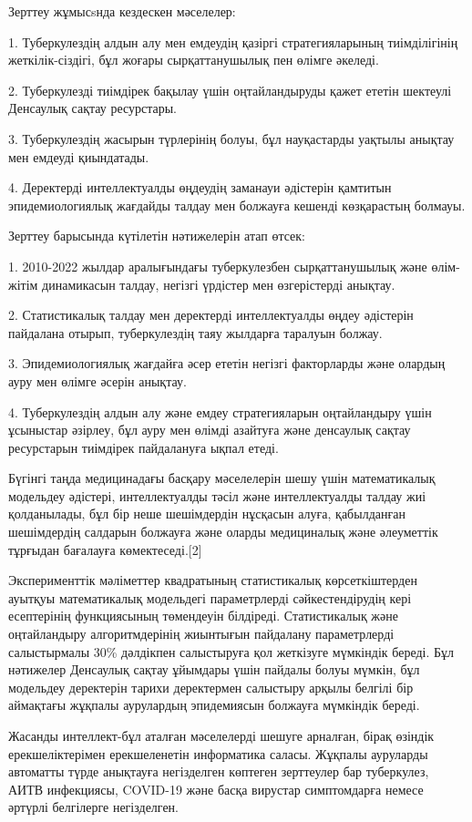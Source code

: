 \begin{multicols}{2}
Зерттеу жұмысsнда кездескен мәселелер:

1. Туберкулездің алдын алу мен емдеудің қазіргі стратегияларының
тиімділігінің жеткілік-сіздігі, бұл жоғары сырқаттанушылық пен өлімге
әкеледі.

2. Туберкулезді тиімдірек бақылау үшін оңтайландыруды қажет ететін
шектеулі Денсаулық сақтау ресурстары.

3. Туберкулездің жасырын түрлерінің болуы, бұл науқастарды уақтылы
анықтау мен емдеуді қиындатады.

4. Деректерді интеллектуалды өңдеудің заманауи әдістерін қамтитын
эпидемиологиялық жағдайды талдау мен болжауға кешенді көзқарастың
болмауы.

Зерттеу барысында күтілетін нәтижелерін атап өтсек:

1. 2010-2022 жылдар аралығындағы туберкулезбен сырқаттанушылық және
өлім-жітім динамикасын талдау, негізгі үрдістер мен өзгерістерді
анықтау.

2. Статистикалық талдау мен деректерді интеллектуалды өңдеу әдістерін
пайдалана отырып, туберкулездің таяу жылдарға таралуын болжау.

3. Эпидемиологиялық жағдайға әсер ететін негізгі факторларды және
олардың ауру мен өлімге әсерін анықтау.

4. Туберкулездің алдын алу және емдеу стратегияларын оңтайландыру үшін
ұсыныстар әзірлеу, бұл ауру мен өлімді азайтуға және денсаулық сақтау
ресурстарын тиімдірек пайдалануға ықпал етеді.

Бүгінгі таңда медицинадағы басқару мәселелерін шешу үшін математикалық
модельдеу әдістері, интеллектуалды тәсіл және интеллектуалды талдау жиі
қолданылады, бұл бір неше шешімдердін нұсқасын алуға, қабылданған
шешімдердің салдарын болжауға және оларды медициналық және әлеуметтік
тұрғыдан бағалауға көмектеседі.{[}2{]}

Эксперименттік мәліметтер квадратының статистикалық көрсеткіштерден
ауытқуы математикалық модельдегі параметрлерді сәйкестендірудің кері
есептерінің функциясының төмендеуін білдіреді. Статистикалық және
оңтайландыру алгоритмдерінің жиынтығын пайдалану параметрлерді
салыстырмалы 30\% дәлдікпен салыстыруға қол жеткізуге мүмкіндік береді.
Бұл нәтижелер Денсаулық сақтау ұйымдары үшін пайдалы болуы мүмкін, бұл
модельдеу деректерін тарихи деректермен салыстыру арқылы белгілі бір
аймақтағы жұқпалы аурулардың эпидемиясын болжауға мүмкіндік береді.

Жасанды интеллект-бұл аталған мәселелерді шешуге арналған, бірақ өзіндік
ерекшеліктерімен ерекшеленетін информатика саласы. Жұқпалы ауруларды
автоматты түрде анықтауға негізделген көптеген зерттеулер бар
туберкулез, АИТВ инфекциясы, COVID-19 және басқа вирустар симптомдарға
немесе әртүрлі белгілерге негізделген.


\end{multicols}
